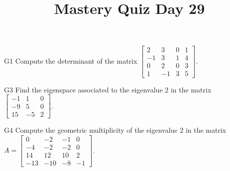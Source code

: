 \documentclass{sbgLAquiz}
\title{Mastery Quiz Day 29 }
\begin{document}
\begin{problem}{G1}
Compute the determinant of the matrix $\begin{bmatrix} 2 & 3 & 0 & 1 \\ -1 & 3 & 1 & 4 \\ 0 & 2 & 0 & 3 \\ 1 & -1 & 3 & 5 \end{bmatrix}$.
\end{problem}

\begin{problem}{G3}
Find the eigenspace associated to the eigenvalue $2$ in the matrix $\begin{bmatrix} -1 & 1 & 0 \\ -9 & 5 & 0 \\ 15 & -5 & 2 \end{bmatrix}$.
\end{problem}
\newpage

\begin{problem}{G4}
Compute the geometric multiplicity of the eigenvalue $2$ in the matrix $A=\begin{bmatrix}0 & -2 & -1 & 0 \\ -4 & -2 & -2 & 0 \\ 14 & 12 & 10 & 2 \\ -13 & -10 & -8 & -1 \end{bmatrix}$.
\end{problem}
\end{document}
